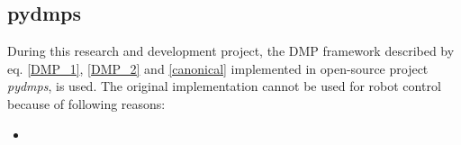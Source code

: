 \subsection{pydmps}

During this research and development project, the DMP framework described by eq. \ref{DMP_1}, \ref{DMP_2} and \ref{canonical} implemented in open-source project \textit{pydmps}\cite{pydmps}, is used. The original implementation cannot be used for robot control because of following reasons: 
\begin{itemize}
	\item 
\end{itemize} 
